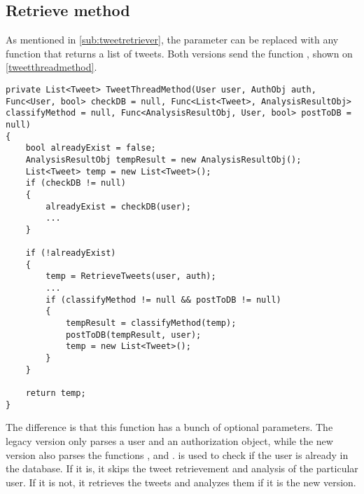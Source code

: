 \subsection{Retrieve method}
As mentioned in \autoref{sub:tweetretriever}, the 
parameter can be replaced with any function that returns a list of tweets. Both
versions send the function , shown on
\autoref{tweetthreadmethod}. \\

\begin{minipage}[H]{\linewidth}
\begin{lstlisting}[caption = The TweetThreadMethod function, label =
tweetthreadmethod]
private List<Tweet> TweetThreadMethod(User user, AuthObj auth, Func<User, bool> checkDB = null, Func<List<Tweet>, AnalysisResultObj> classifyMethod = null, Func<AnalysisResultObj, User, bool> postToDB = null)
{
    bool alreadyExist = false;
    AnalysisResultObj tempResult = new AnalysisResultObj();
    List<Tweet> temp = new List<Tweet>();
    if (checkDB != null)
    {
        alreadyExist = checkDB(user);
		...
    }

    if (!alreadyExist)
    {
        temp = RetrieveTweets(user, auth);
		...	
        if (classifyMethod != null && postToDB != null)
        {
            tempResult = classifyMethod(temp); 
            postToDB(tempResult, user); 
            temp = new List<Tweet>();
        }
    }

    return temp;
}
\end{lstlisting}
\end{minipage}
The difference is that this function has a bunch of optional parameters. The legacy version only parses
a user and an authorization object, while the new version also parses the
functions ,  and .
 is used to check if the user is already in the database. If it
is, it skips the tweet retrievement and analysis of the particular user. If it is not, it retrieves the tweets and analyzes them if it
is the new version.
